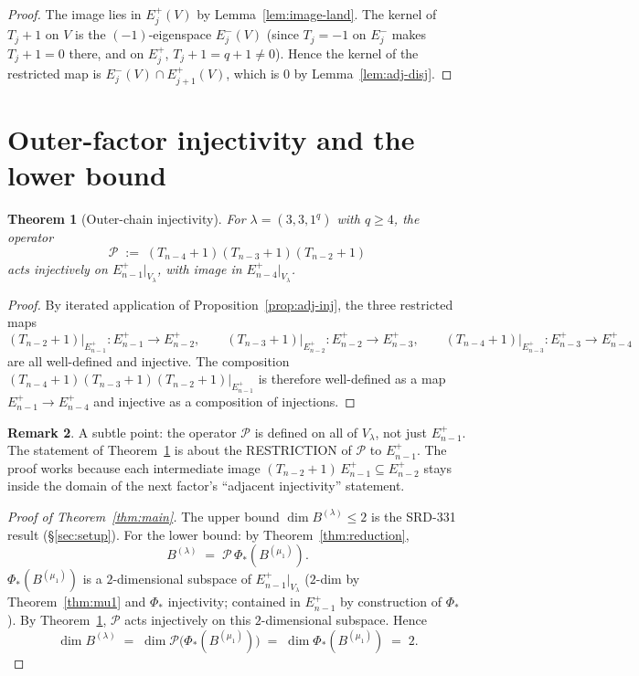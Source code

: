 \documentclass[11pt]{article}
\newtheorem{theorem}{Theorem}
\theoremstyle{definition}
\newtheorem{remark}[theorem]{Remark}
\begin{document}
\begin{proof}
The image lies in $E_j^+(V)$ by Lemma~\ref{lem:image-land}. The
kernel of $T_j + 1$ on $V$ is the $(-1)$-eigenspace
$E_j^-(V)$ (since $T_j = -1$ on $E_j^-$ makes $T_j + 1 = 0$ there,
and on $E_j^+$, $T_j + 1 = q + 1 \ne 0$). Hence the kernel of the
restricted map is $E_j^-(V) \cap E_{j+1}^+(V)$, which is $0$ by
Lemma~\ref{lem:adj-disj}.
\end{proof}

\section{Outer-factor injectivity and the lower bound}\label{sec:lower}

\begin{theorem}[Outer-chain injectivity]\label{thm:chain-inj}
For $\lambda = (3, 3, 1^q)$ with $q \ge 4$, the operator
\[
   \mathcal{P} \;:=\; (T_{n-4}{+}1)(T_{n-3}{+}1)(T_{n-2}{+}1)
\]
acts \emph{injectively} on $E_{n-1}^+|_{V_\lambda}$, with image in
$E_{n-4}^+|_{V_\lambda}$.
\end{theorem}

\begin{proof}
By iterated application of Proposition~\ref{prop:adj-inj}, the three
restricted maps
\[
   (T_{n-2}+1)\big|_{E_{n-1}^+} : E_{n-1}^+ \to E_{n-2}^+,
   \qquad
   (T_{n-3}+1)\big|_{E_{n-2}^+} : E_{n-2}^+ \to E_{n-3}^+,
   \qquad
   (T_{n-4}+1)\big|_{E_{n-3}^+} : E_{n-3}^+ \to E_{n-4}^+
\]
are all well-defined and injective. The composition
$(T_{n-4}+1)(T_{n-3}+1)(T_{n-2}+1)\big|_{E_{n-1}^+}$ is therefore
well-defined as a map $E_{n-1}^+ \to E_{n-4}^+$ and injective as a
composition of injections.
\end{proof}

\begin{remark}\label{rem:domain-issue}
A subtle point: the operator $\mathcal{P}$ is defined on all of
$V_\lambda$, not just $E_{n-1}^+$. The statement of
Theorem~\ref{thm:chain-inj} is about the RESTRICTION of $\mathcal{P}$
to $E_{n-1}^+$. The proof works because each intermediate image
$(T_{n-2}+1)\,E_{n-1}^+ \subseteq E_{n-2}^+$ stays inside the domain
of the next factor's ``adjacent injectivity'' statement.
\end{remark}

\begin{proof}[Proof of Theorem~\ref{thm:main}]
The upper bound $\dim B^{(\lambda)} \le 2$ is the SRD-331 result
(\S\ref{sec:setup}). For the lower bound: by
Theorem~\ref{thm:reduction},
\[
   B^{(\lambda)} \;=\; \mathcal{P}\,\Phi_*(B^{(\mu_1)}).
\]
$\Phi_*(B^{(\mu_1)})$ is a $2$-dimensional subspace of
$E_{n-1}^+|_{V_\lambda}$ ($2$-dim by Theorem~\ref{thm:mu1} and $\Phi_*$
injectivity; contained in $E_{n-1}^+$ by construction of $\Phi_*$). By
Theorem~\ref{thm:chain-inj}, $\mathcal{P}$ acts injectively on this
$2$-dimensional subspace. Hence
\[
   \dim B^{(\lambda)} \;=\; \dim \mathcal{P}\big(\Phi_*(B^{(\mu_1)})\big)
   \;=\; \dim \Phi_*(B^{(\mu_1)}) \;=\; 2.
\]
\end{proof}
\end{document}
